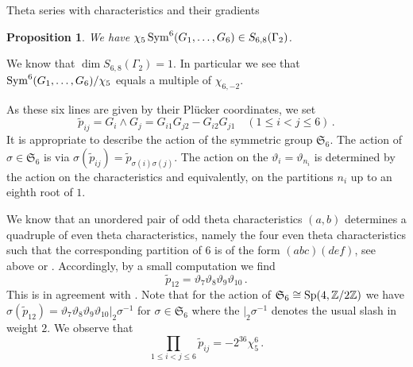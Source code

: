 \documentclass[12pt]{amsart}
\numberwithin{equation}{section}
\newcommand{\ZZ}{\mathbb Z}
\def\leq{\leqslant}
\numberwithin{equation}{section}
\newtheorem{proposition}[theorem]{Proposition}
\theoremstyle{definition}
\theoremstyle{remark}
\begin{document}
\begin{section}{Theta series with characteristics and their gradients}
\begin{proposition}
We have
$\chi_5\, {\rm Sym}^6(G_1,\ldots,G_6) \in S_{6,8}(\Gamma_2)$.
\end{proposition}
We know that $\dim S_{6,8}(\Gamma_2)=1$.
In particular we see that ${\rm Sym}^6(G_1,\ldots,G_6)/\chi_5$ equals a multiple
of $\chi_{6,-2}$.

As these six lines are given by their Pl\"ucker coordinates, we set
$$
\tilde{p}_{ij}=G_i\wedge G_j=G_{i1}G_{j2}-G_{i2}G_{j1} \quad (1\leq i < j \leq 6)\, .
$$
It is appropriate to describe the action of the symmetric group $\mathfrak{S}_6$.
The action of $\sigma\in \mathfrak{S}_6$ is via $\sigma(\tilde{p}_{ij})=\tilde{p}_{\sigma(i) \sigma(j)}$.
The action on the $\vartheta_i=\vartheta_{n_i}$ is determined by the action on the 
characteristics and equivalently, on the partitions $n_i$ up to an eighth root of $1$.

We know that an unordered pair of odd theta characteristics $(a,b)$
determines a quadruple of even theta characteristics, namely the four even theta characteristics
such that the corresponding partition of $6$ is
of the form $(abc)(def)$,
see above or \cite[Lemma 3.1]{CvdGG}.
Accordingly, by a small computation we find
$$
\tilde{p}_{12}= \vartheta_7\vartheta_8\vartheta_9 \vartheta_{10} \, .
$$
This is in agreement with \cite[Lemma 5.1]{F-SM2015}.
Note that for the action of $\mathfrak{S}_6\cong {\rm Sp}(4,{\ZZ}/2{\ZZ})$ we have
$ \sigma(\tilde{p}_{12})= \vartheta_7\vartheta_8\vartheta_9 \vartheta_{10}{|_2 \sigma^{-1}}$
for $\sigma \in \mathfrak{S}_6$ where the $|_2\sigma^{-1}$ denotes the usual slash in weight $2$.
We observe that 
$$
\prod_{1 \leq i < j \leq 6} \tilde{p}_{ij}= - 2^{36} \chi_5^6\, .
$$

\end{section}
\end{document}
